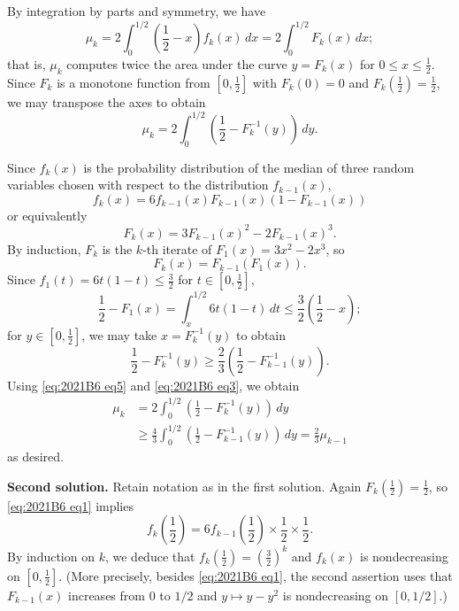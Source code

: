 \documentclass[amssymb,twocolumn,pra,10pt,aps]{revtex4-1}
\begin{document}
\begin{itemize}
By integration by parts and symmetry, we have
\[
\mu_k = 2 \int_0^{1/2} \left( \frac{1}{2} - x \right) f_k(x)\,dx  = 2 \int_0^{1/2} F_k(x)\,dx;
\]
that is, $\mu_k$ computes twice the area under the curve $y = F_k(x)$ for $0 \leq x \leq\frac{1}{2}$. Since $F_k$ is a monotone function from $[0, \frac{1}{2}]$ 
with $F_k(0) = 0$ and $F_k(\frac{1}{2}) = \frac{1}{2}$, we may transpose the axes to obtain
\begin{equation} \label{eq:2021B6 eq4}
\mu_k = 2 \int_0^{1/2} \left( \frac{1}{2} - F_k^{-1}(y) \right)\,dy.
\end{equation}

Since $f_k(x)$ is the probability distribution of the median of three random variables chosen with respect to the distribution $f_{k-1}(x)$,
\begin{equation} \label{eq:2021B6 eq1}
f_k(x) = 6 f_{k-1}(x) F_{k-1}(x) ( 1-F_{k-1}(x) )
\end{equation}
or equivalently
\begin{equation} \label{eq:2021B6 eq2}
F_k(x) = 3 F_{k-1}(x)^2 - 2 F_{k-1}(x)^3.
\end{equation}
By induction, $F_k$ is the $k$-th iterate of $F_1(x) = 3x^2 -2x^3$, so
\begin{equation} \label{eq:2021B6 eq5}
F_k(x) = F_{k-1}(F_1(x)).
\end{equation}
Since $f_1(t) = 6t(1-t) \leq \frac{3}{2}$ for $t \in [0,\frac{1}{2}]$,
\[
\frac{1}{2} - F_1(x) = \int_x^{1/2} 6t(1-t)\,dt \leq \frac{3}{2}\left(\frac{1}{2}-x\right);
\]
for $y \in [0, \frac{1}{2}]$, we may take $x = F_{k}^{-1}(y)$ to obtain
\begin{equation} \label{eq:2021B6 eq3}
\frac{1}{2} - F_k^{-1}(y) \geq \frac{2}{3} \left( \frac{1}{2} - F_{k-1}^{-1}(y) \right).
\end{equation}
Using \eqref{eq:2021B6 eq5} and \eqref{eq:2021B6 eq3}, we obtain
\begin{align*}
\mu_k &= 2 \int_0^{1/2} \left( \frac{1}{2} - F_k^{-1}(y) \right) \,dy \\
&\geq \frac{4}{3} \int_0^{1/2} \left( \frac{1}{2} - F_{k-1}^{-1}(y) \right) \,dy = \frac{2}{3}\mu_{k-1}
\end{align*}
as desired.

\noindent
\textbf{Second solution.}
Retain notation as in the first solution. Again $F_k(\frac{1}{2}) = \frac{1}{2}$, so \eqref{eq:2021B6 eq1} implies
\[
f_k\left( \frac{1}{2} \right) = 6 f_{k-1} \left( \frac{1}{2} \right) \times \frac{1}{2} \times \frac{1}{2}.
\]
By induction on $k$, we deduce that %
$f_k(\frac{1}{2}) = (\frac{3}{2})^k$
and $f_k(x)$ is nondecreasing on $[0,\frac{1}{2}]$.
(More precisely, besides \eqref{eq:2021B6 eq1}, the second assertion uses that $F_{k-1}(x)$ increases from $0$ to $1/2$
and $y \mapsto y - y^2$ is nondecreasing on $[0, 1/2]$.)


\end{itemize}
\end{document}
